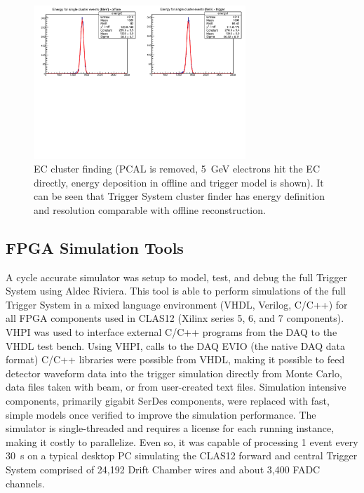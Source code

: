 \begin{figure}[htp]
	\begin{center}
		\centering
		\includegraphics[width=8cm]{img/ecal_sim3.png}
		\caption{EC cluster finding (PCAL is removed, 5~GeV electrons hit the EC directly, energy deposition in offline and trigger model is shown). It can be seen that Trigger System cluster finder has energy definition and resolution comparable with offline reconstruction.}
		\label{fig:ecal_sim3}
	\end{center}
\end{figure} 


\subsection{FPGA Simulation Tools}

A cycle accurate simulator was setup to model, test, and debug the full Trigger System using Aldec Riviera. This tool is able to perform simulations of the full Trigger System in a mixed language environment (VHDL, Verilog, C/C++) for all FPGA components used in CLAS12 (Xilinx series 5, 6, and 7 components). VHPI was used to interface external C/C++ programs from the DAQ to the VHDL test bench. Using VHPI, calls to the DAQ EVIO (the native DAQ data format) C/C++ libraries were possible from VHDL, making it possible to feed detector waveform data into the trigger simulation directly from Monte Carlo, data files taken with beam, or from user-created text files. Simulation intensive components, primarily gigabit SerDes components, were replaced with fast, simple models once verified to improve the simulation performance. The simulator is single-threaded and requires a license for each running instance, making it costly to parallelize. Even so, it was capable of processing 1 event every 30~s on a typical desktop PC simulating the CLAS12 forward and central Trigger System comprised of 24,192 Drift Chamber wires and about 3,400 FADC channels.

